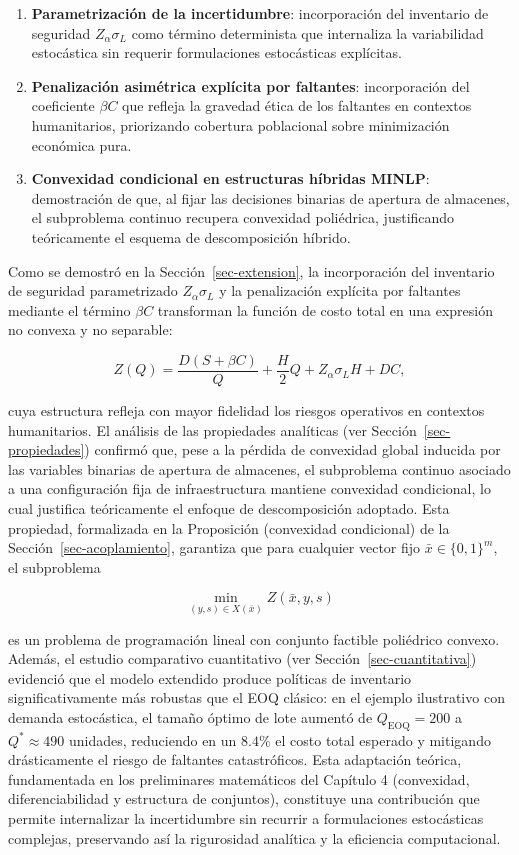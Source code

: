 \documentclass[
  spanish,
  us-letterpaper,
]{scrreprt}
\numberwithin{equation}{section}
\begin{document}
\begin{enumerate}
\def\labelenumi{\arabic{enumi}.}
\item
  \textbf{Parametrización de la incertidumbre}: incorporación del
  inventario de seguridad \(Z_\alpha \sigma_L\) como término
  determinista que internaliza la variabilidad estocástica sin requerir
  formulaciones estocásticas explícitas.
\item
  \textbf{Penalización asimétrica explícita por faltantes}:
  incorporación del coeficiente \(\beta C\) que refleja la gravedad
  ética de los faltantes en contextos humanitarios, priorizando
  cobertura poblacional sobre minimización económica pura.
\item
  \textbf{Convexidad condicional en estructuras híbridas MINLP}:
  demostración de que, al fijar las decisiones binarias de apertura de
  almacenes, el subproblema continuo recupera convexidad poliédrica,
  justificando teóricamente el esquema de descomposición híbrido.
\end{enumerate}

Como se demostró en la Sección~\ref{sec-extension}, la incorporación del
inventario de seguridad parametrizado \(Z_\alpha \sigma_L\) y la
penalización explícita por faltantes mediante el término \(\beta C\)
transforman la función de costo total en una expresión no convexa y no
separable:

\[
Z(Q) = \frac{D(S + \beta C)}{Q} + \frac{H}{2}Q + Z_\alpha \sigma_L H + DC,
\]

cuya estructura refleja con mayor fidelidad los riesgos operativos en
contextos humanitarios. El análisis de las propiedades analíticas (ver
Sección~\ref{sec-propiedades}) confirmó que, pese a la pérdida de
convexidad global inducida por las variables binarias de apertura de
almacenes, el subproblema continuo asociado a una configuración fija de
infraestructura mantiene convexidad condicional, lo cual justifica
teóricamente el enfoque de descomposición adoptado. Esta propiedad,
formalizada en la Proposición (convexidad condicional) de la
Sección~\ref{sec-acoplamiento}, garantiza que para cualquier vector fijo
\(\bar{x} \in \{0,1\}^m\), el subproblema

\[
\min_{(y,s) \in X(\bar{x})} Z(\bar{x}, y, s)
\]

es un problema de programación lineal con conjunto factible poliédrico
convexo. Además, el estudio comparativo cuantitativo (ver
Sección~\ref{sec-cuantitativa}) evidenció que el modelo extendido
produce políticas de inventario significativamente más robustas que el
EOQ clásico: en el ejemplo ilustrativo con demanda estocástica, el
tamaño óptimo de lote aumentó de \(Q_{\text{EOQ}} = 200\) a
\(Q^* \approx 490\) unidades, reduciendo en un \(8.4\%\) el costo total
esperado y mitigando drásticamente el riesgo de faltantes catastróficos.
Esta adaptación teórica, fundamentada en los preliminares matemáticos
del Capítulo 4 (convexidad, diferenciabilidad y estructura de
conjuntos), constituye una contribución que permite internalizar la
incertidumbre sin recurrir a formulaciones estocásticas complejas,
preservando así la rigurosidad analítica y la eficiencia computacional.
\end{document}
